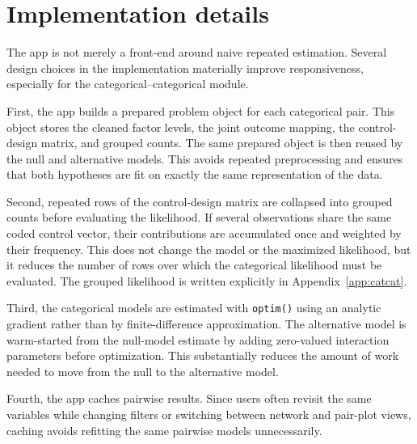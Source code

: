\documentclass[11pt]{article}
\newcommand{\code}[1]{\texttt{#1}}
\begin{document}
\section{Implementation details}
\label{sec:implementation}

The app is not merely a front-end around naive
repeated estimation. Several design choices in the implementation materially
improve responsiveness, especially for the categorical--categorical module.

First, the app builds a prepared problem object for each categorical pair. This
object stores the cleaned factor levels, the joint outcome mapping, the
control-design matrix, and grouped counts. The same prepared object is then
reused by the null and alternative models. This avoids repeated preprocessing
and ensures that both hypotheses are fit on exactly the same representation of
the data.

Second, repeated rows of the control-design matrix are collapsed into grouped
counts before evaluating the likelihood. If several observations share the same
coded control vector, their contributions are accumulated once and weighted by
their frequency. This does not change the model or the maximized likelihood, but
it reduces the number of rows over which the categorical likelihood must be
evaluated. The grouped likelihood is written explicitly in
Appendix~\ref{app:catcat}.

Third, the categorical models are estimated with \code{optim()} using an
analytic gradient rather than by finite-difference approximation. The
alternative model is warm-started from the null-model estimate by adding
zero-valued interaction parameters before optimization. This substantially
reduces the amount of work needed to move from the null to the alternative
model.

Fourth, the app caches pairwise results. Since users often revisit the same
variables while changing filters or switching between network and pair-plot
views, caching avoids refitting the same pairwise models unnecessarily.
\end{document}
